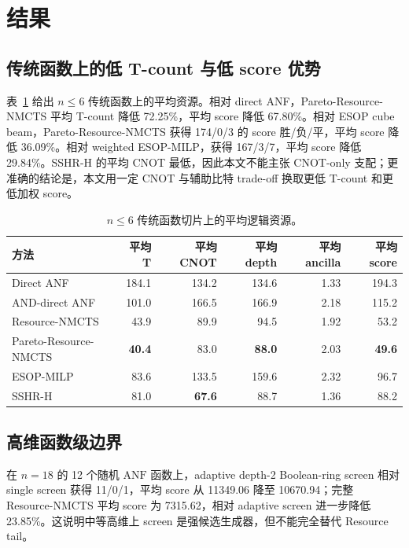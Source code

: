\documentclass[UTF8,fontset=macnew,11pt]{ctexart}
\newcommand{\method}{Resource-NMCTS}
\newcommand{\screen}{Boolean-ring screen}
\newcommand{\anf}{\ensuremath{\mathrm{ANF}}}
\begin{document}
\section{结果}

\subsection{传统函数上的低 T-count 与低 score 优势}

表~\ref{tab:traditional} 给出 $n\leq6$ 传统函数上的平均资源。相对 direct ANF，Pareto-\method{} 平均 T-count 降低 72.25\%，平均 score 降低 67.80\%。相对 ESOP cube beam，Pareto-\method{} 获得 174/0/3 的 score 胜/负/平，平均 score 降低 36.09\%。相对 weighted ESOP-MILP，获得 167/3/7，平均 score 降低 29.84\%。SSHR-H 的平均 CNOT 最低，因此本文不能主张 CNOT-only 支配；更准确的结论是，本文用一定 CNOT 与辅助比特 trade-off 换取更低 T-count 和更低加权 score。

\begin{table}[H]
\centering
\small
\caption{$n\leq6$ 传统函数切片上的平均逻辑资源。}
\label{tab:traditional}
\begin{tabular}{lrrrrr}
\toprule
方法 & 平均 T & 平均 CNOT & 平均 depth & 平均 ancilla & 平均 score \\
\midrule
Direct ANF & 184.1 & 134.2 & 134.6 & 1.33 & 194.3 \\
AND-direct ANF & 101.0 & 166.5 & 166.9 & 2.18 & 115.2 \\
\method{} & 43.9 & 89.9 & 94.5 & 1.92 & 53.2 \\
Pareto-\method{} & \textbf{40.4} & 83.0 & \textbf{88.0} & 2.03 & \textbf{49.6} \\
ESOP-MILP & 83.6 & 133.5 & 159.6 & 2.32 & 96.7 \\
SSHR-H & 81.0 & \textbf{67.6} & 88.7 & 1.36 & 88.2 \\
\bottomrule
\end{tabular}
\end{table}

\subsection{高维函数级边界}

在 $n=18$ 的 12 个随机 \anf{} 函数上，adaptive depth-2 \screen{} 相对 single screen 获得 11/0/1，平均 score 从 11349.06 降至 10670.94；完整 \method{} 平均 score 为 7315.62，相对 adaptive screen 进一步降低 23.85\%。这说明中等高维上 screen 是强候选生成器，但不能完全替代 Resource tail。
\end{document}
